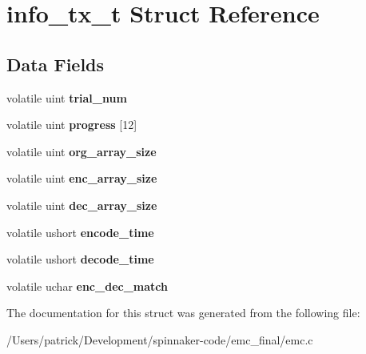 \hypertarget{structinfo__tx__t}{}\section{info\+\_\+tx\+\_\+t Struct Reference}
\label{structinfo__tx__t}
\subsection*{Data Fields}
\begin{DoxyCompactItemize}
\item 
volatile uint {\bfseries trial\+\_\+num}\hypertarget{structinfo__tx__t_acaca41d7925c2322500b42835a31578f}{}\label{structinfo__tx__t_acaca41d7925c2322500b42835a31578f}

\item 
volatile uint {\bfseries progress} \mbox{[}12\mbox{]}\hypertarget{structinfo__tx__t_ac60a16ea8302218b9155d794cc004733}{}\label{structinfo__tx__t_ac60a16ea8302218b9155d794cc004733}

\item 
volatile uint {\bfseries org\+\_\+array\+\_\+size}\hypertarget{structinfo__tx__t_a47b036de602064b79b25f47190f40545}{}\label{structinfo__tx__t_a47b036de602064b79b25f47190f40545}

\item 
volatile uint {\bfseries enc\+\_\+array\+\_\+size}\hypertarget{structinfo__tx__t_a6134272a13fdffb27d49f3865947754f}{}\label{structinfo__tx__t_a6134272a13fdffb27d49f3865947754f}

\item 
volatile uint {\bfseries dec\+\_\+array\+\_\+size}\hypertarget{structinfo__tx__t_abd34f837ab3fee47974012de045e790c}{}\label{structinfo__tx__t_abd34f837ab3fee47974012de045e790c}

\item 
volatile ushort {\bfseries encode\+\_\+time}\hypertarget{structinfo__tx__t_ace86e7e615f94aa053bbc4f3d5302550}{}\label{structinfo__tx__t_ace86e7e615f94aa053bbc4f3d5302550}

\item 
volatile ushort {\bfseries decode\+\_\+time}\hypertarget{structinfo__tx__t_aabccf4dd7e5143dbef1de02c599834d8}{}\label{structinfo__tx__t_aabccf4dd7e5143dbef1de02c599834d8}

\item 
volatile uchar {\bfseries enc\+\_\+dec\+\_\+match}\hypertarget{structinfo__tx__t_ae178d253255bf9eab2297747c5453490}{}\label{structinfo__tx__t_ae178d253255bf9eab2297747c5453490}

\end{DoxyCompactItemize}


The documentation for this struct was generated from the following file\+:\begin{DoxyCompactItemize}
\item 
/\+Users/patrick/\+Development/spinnaker-\/code/emc\+\_\+final/emc.\+c\end{DoxyCompactItemize}
